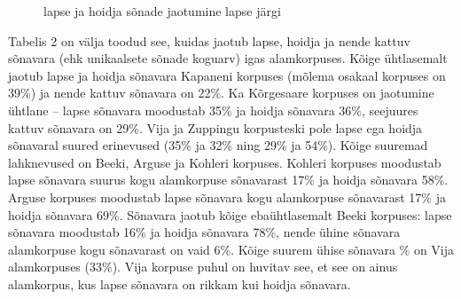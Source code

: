 \documentclass[12pt]{article}
\begin{document}
\begin{figure}[H]
    \centering
    \qquad
    \caption{lapse ja hoidja sõnade jaotumine lapse järgi}
\end{figure}



Tabelis 2 on välja toodud see, kuidas jaotub lapse, hoidja ja nende kattuv sõnavara (ehk unikaalsete sõnade koguarv) igas alamkorpuses. Kõige ühtlasemalt jaotub lapse ja hoidja sõnavara Kapaneni korpuses (mõlema osakaal korpuses on 39\%) ja nende kattuv sõnavara on 22\%. Ka Kõrgesaare korpuses on jaotumine ühtlane -- lapse sõnavara moodustab 35\% ja hoidja sõnavara 36\%, seejuures kattuv sõnavara on 29\%. Vija ja Zuppingu korpusteski pole lapse ega hoidja sõnavaral suured erinevused (35\% ja 32\% ning 29\% ja 54\%). Kõige suuremad lahknevused on Beeki, Arguse ja Kohleri korpuses. Kohleri korpuses moodustab lapse sõnavara suurus kogu alamkorpuse sõnavarast 17\% ja hoidja sõnavara 58\%. Arguse korpuses moodustab lapse sõnavara kogu alamkorpuse sõnavarast 17\% ja hoidja sõnavara 69\%. Sõnavara jaotub kõige ebaühtlasemalt Beeki korpuses: lapse sõnavara moodustab 16\% ja hoidja sõnavara 78\%, nende ühine sõnavara alamkorpuse kogu sõnavarast on vaid 6\%. Kõige suurem ühise sõnavara \% on Vija alamkorpuses (33\%). Vija korpuse puhul on huvitav see, et see on ainus alamkorpus, kus lapse sõnavara on rikkam kui hoidja sõnavara.
\end{document}
